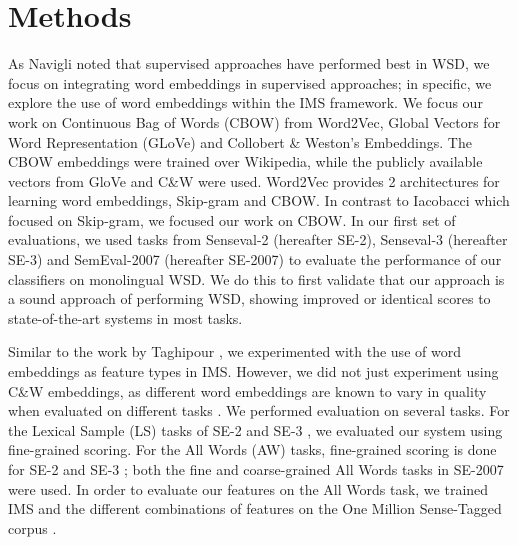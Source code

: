 \section{Methods}
\label{section:methods}

As Navigli  noted that supervised approaches have performed best in WSD, we focus on integrating word embeddings in supervised approaches; in specific,
we explore the use of word embeddings within the IMS framework. We focus our work on Continuous Bag of Words (CBOW) from Word2Vec,  Global Vectors for Word Representation (GLoVe) and Collobert \& Weston's Embeddings. The CBOW embeddings were trained over Wikipedia, while the publicly available vectors from GloVe and C\&W were used. Word2Vec provides 2 architectures for learning word embeddings, Skip-gram and CBOW. In contrast to Iacobacci  which focused on Skip-gram, we focused our work on CBOW.
In our first set of evaluations, we used tasks from Senseval-2 (hereafter SE-2), Senseval-3 (hereafter SE-3) and SemEval-2007 (hereafter SE-2007) to evaluate the performance of our classifiers on monolingual WSD. We do this to first validate that our approach is a sound approach of performing WSD, showing improved or identical scores to state-of-the-art systems in most tasks. 

Similar to the work by Taghipour , we experimented with the use of word embeddings as feature types in IMS. However, we did not just experiment using C\&W embeddings, as different word embeddings are known to vary in quality when evaluated on different tasks \cite{schnabel2015evaluation}. We performed evaluation on several tasks. For the Lexical Sample (LS) tasks of SE-2 \cite{senseval2-LS-kilgarriff2001} and SE-3 \cite{senseval3-LS-mihalcea2004}, we evaluated our system using fine-grained scoring. For the All Words (AW) tasks, fine-grained scoring is done for SE-2 \cite{senseval2-AW-palmer2001} and SE-3 \cite{senseval3-AW-snyder2004}; both the fine \cite{semeval2007-fine-pradhan2007} and coarse-grained \cite{semeval2007-coarse-navigli2007} All Words tasks in SE-2007 were used. In order to evaluate our features on the All Words task, we trained IMS and the different combinations of features on the One Million Sense-Tagged corpus \cite{taghipour2015one}.


